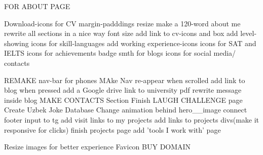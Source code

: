 
FOR ABOUT PAGE

Download-icons for CV
margin-padddings resize
make a 120-word about me
rewrite all sections in a nice way
font size
add link to cv-icons and box
add level-showing icons for skill-languages
add working experience-icons
icons for SAT and IELTS
icons for achievements badge 
smth for blogs
icons for social media/ contacts


REMAKE nav-bar for phones
MAke Nav re-appear when scrolled
add link to blog when pressed
add a Google drive link to university pdf
rewrite message inside blog
MAKE CONTACTS Section
Finish LAUGH CHALLENGE page
Create Uzbek Joke Database
Change animation behind hero__image
connect footer input to tg
add visit links to my projects
add links to projects divs(make it responsive for clicks)
finish projects page
add 'tools I work with' page

Resize images for better experience
Favicon
BUY DOMAIN



